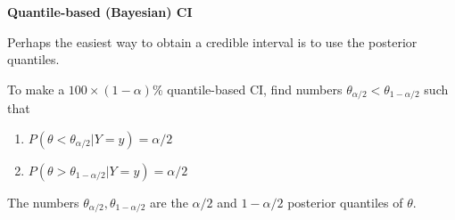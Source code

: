 \documentclass[12pt,xcolor=svgnames]{beamer}
\newcommand{\theme}{\color{FireBrick}}
\newcommand{\sk}{\vspace{.4cm}}
\newcommand{\chap}[1]{{\theme \Large \bf #1} \sk}
\begin{document}
\begin{frame}
\chap{Quantile-based (Bayesian) CI}

Perhaps the easiest way to obtain a credible interval is to use the posterior quantiles.

To make a $100 \times (1-\alpha)$\% quantile-based CI, find numbers $\theta_{\alpha/2}<\theta_{1- \alpha/2}$ such that

\begin{enumerate}
\item $P(\theta <\theta_{\alpha/2} |Y=y)=\alpha/2$
\item $P(\theta >\theta_{1-\alpha/2} |Y=y)=\alpha/2$
\end{enumerate}
The numbers $\theta_{\alpha/2},\theta_{1- \alpha/2}$ are the $\alpha/2$ and  $1-\alpha/2$ posterior quantiles of $\theta$.\\

\end{frame}
\end{document}
